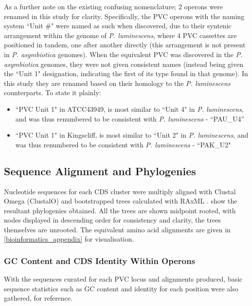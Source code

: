 As a further note on the existing confusing nomenclature; 2 operons were renamed in this study for clarity. Specifically, the PVC operons with the naming system ``Unit \#" were named as such when discovered, due to their syntenic arrangement within the genome of \emph{P. luminescens}, where 4 PVC cassettes are positioned in tandem, one after another directly (this arrangement is not present in \emph{P. asymbiotica} genomes). When the equivalent PVC was discovered in the \emph{P. asymbiotica} genomes, they were not given consistent names (instead being given the ``Unit 1" designation, indicating the first of its type found in that genome). In this study they are renamed based on their homology to the \emph{P. luminescens} counterparts. To state it plainly:

\begin{itemize}
	\item ``PVC Unit 1" in \Pa{} ATCC43949, is most similar to ``Unit 4" in \emph{P. luminescens}, and was thus renumbered to be consistent with \emph{P. luminescens} - ``PAU\_U4''
	\item ``PVC Unit  1" in \Pa{} Kingscliff, is most similar to ``Unit 2" in \emph{P. luminescens}, and was thus renumbered to be consistent with \emph{P. luminescens} - ``PAK\_U2"
\end{itemize}

\subsection{Sequence Alignment and Phylogenies}
	Nucleotide sequences for each CDS cluster were multiply aligned with Clustal Omega (ClustalO) \citep{Sievers2011} and bootstrapped trees calculated with RAxML \citep{Stamatakis2014}.  show the resultant phylogenies obtained. All the trees are shown midpoint rooted, with nodes displayed in descending order for consistency and clarity, the trees themselves are unrooted. The equivalent amino acid alignments are given in \vref{bioinformatics_appendix} for visualisation.

\subsubsection{GC Content and CDS Identity Within Operons}
With the sequences curated for each PVC locus and alignments produced, basic sequence statistics such as GC content and identity for each position were also gathered, for reference. 

